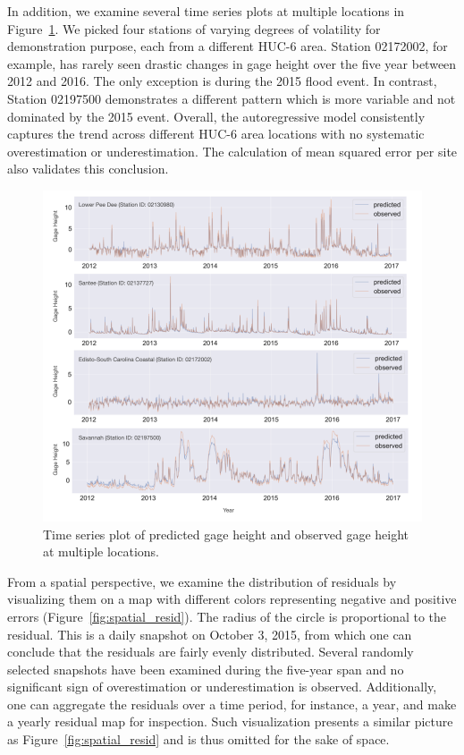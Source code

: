 \documentclass{svjour3}
\renewcommand\hl[1]{#1}
\begin{document}
\hl{In addition, we examine several time series plots at multiple locations in Figure~{\ref{fig:per_site}}.
We picked four stations of varying degrees of volatility for demonstration purpose, each from a different HUC-6 area.
Station 02172002, for example, has rarely seen drastic changes in gage height over the five year between 2012
and 2016.
The only exception is during the 2015 flood event.
In contrast, Station 02197500 demonstrates a different pattern which is more variable and not dominated by the 2015
event.
Overall, the autoregressive model consistently captures the trend across different HUC-6 area locations
with no systematic overestimation or underestimation.
The calculation of mean squared error per site also validates this conclusion.} \\

\begin{figure}[htbp]
\centering
\includegraphics[width=1\textwidth]{../images/prediction_of_four_sites.png}
\caption{\hl{Time series plot of predicted gage height and observed gage height at multiple locations.}}
\label{fig:per_site}
\end{figure}

From a spatial perspective, we examine the distribution of residuals by visualizing them on a map with different colors representing \hl{negative and positive errors} (Figure~\ref{fig:spatial_resid}).
The radius of the circle is proportional to the residual.
This is a daily snapshot on October 3, 2015, from which one can conclude that the residuals are fairly evenly distributed.
Several randomly selected snapshots have been examined during the five-year span and no significant sign of overestimation or underestimation is observed.
 Additionally, one can  aggregate the residuals over a time period, for instance, a year, and make a yearly residual map for inspection.
 Such visualization presents a similar picture as Figure~\ref{fig:spatial_resid} and is thus omitted for the sake of space. \\
\end{document}
